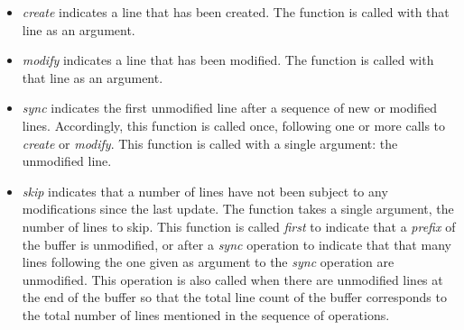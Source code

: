 \begin{itemize}
\item \textit{create} indicates a line that has been created.  The
  function is called with that line as an argument.
\item \textit{modify} indicates a line that has been modified.  The
  function is called with that line as an argument.
\item \textit{sync} indicates the first unmodified line after a
  sequence of new or modified lines.  Accordingly, this function is
  called once, following one or more calls to \textit{create} or
  \textit{modify}.  This function is called with a single argument:
  the unmodified line.
\item \textit{skip} indicates that a number of lines have not been
  subject to any modifications since the last update.  The function
  takes a single argument, the number of lines to skip.  This function
  is called \emph{first} to indicate that a \emph{prefix} of the
  buffer is unmodified, or after a \emph{sync} operation to indicate
  that that many lines following the one given as argument to the
  \textit{sync} operation are unmodified.  This operation is also
  called when there are unmodified lines at the end of the buffer so
  that the total line count of the buffer corresponds to the total
  number of lines mentioned in the sequence of operations.
\end{itemize}

